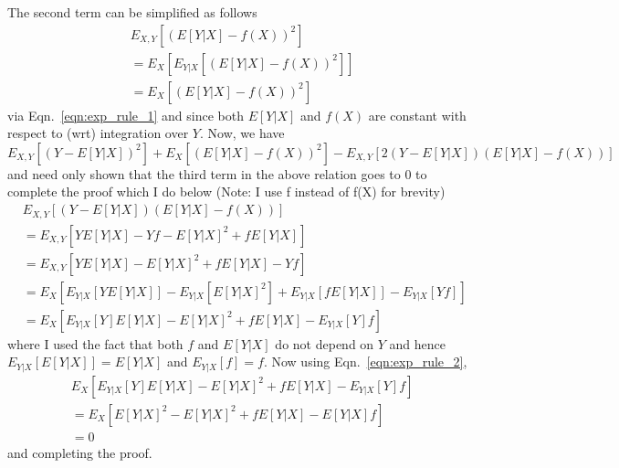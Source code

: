 \documentclass[12pt]{amsart}
\begin{document}
The second term can be simplified as follows
\begin{equation}
\begin{split}
& E_{X,Y}[(E[Y|X] - f(X))^2] \\
& = E_X[E_{Y|X}[(E[Y|X] - f(X))^2]] \\
& = E_X[(E[Y|X] - f(X))^2]
\end{split}
\end{equation}
via Eqn.~\ref{eqn:exp_rule_1} and since both $E[Y|X]$ and $f(X)$ are constant with respect to (wrt) integration over $Y$.  Now, we have
\begin{equation}
E_{X,Y}[(Y - E[Y|X])^2] + E_X[(E[Y|X] - f(X))^2] - E_{X,Y}[2(Y - E[Y|X])(E[Y|X] - f(X))]
\end{equation}
and need only shown that the third term in the above relation goes to 0 to complete the proof which I do below (Note: I use f instead of f(X) for brevity)
\begin{equation}
\begin{split}
& E_{X,Y}[(Y - E[Y|X])(E[Y|X] - f(X))] \\
& = E_{X,Y}[YE[Y|X] - Yf - E[Y|X]^2 + fE[Y|X]] \\
& = E_{X,Y}[YE[Y|X] - E[Y|X]^2 + fE[Y|X] - Yf] \\
& = E_X[E_{Y|X}[YE[Y|X]] - E_{Y|X}[E[Y|X]^2] + E_{Y|X}[fE[Y|X]] - E_{Y|X}[Yf]] \\
& = E_X[E_{Y|X}[Y]E[Y|X] - E[Y|X]^2 + fE[Y|X] - E_{Y|X}[Y]f] 
\end{split}
\end{equation}
where I used the fact that both $f$ and $E[Y|X]$ do not depend on $Y$ and hence $E_{Y|X}[E[Y|X]] = E[Y|X]$ and $E_{Y|X}[f] = f$.  Now using Eqn.~\ref{eqn:exp_rule_2}, 
\begin{equation}
\begin{split}
& E_X[E_{Y|X}[Y]E[Y|X] - E[Y|X]^2 + fE[Y|X] - E_{Y|X}[Y]f] \\
& = E_X[E[Y|X]^2 - E[Y|X]^2 + fE[Y|X] - E[Y|X]f] \\
& = 0
\end{split}
\end{equation}
and completing the proof.
\end{document}
